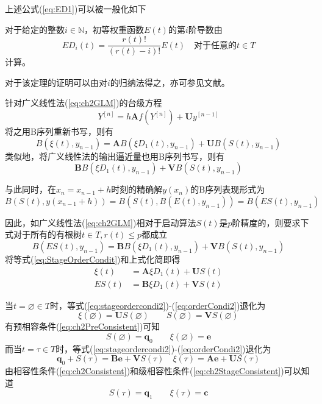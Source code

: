 上述公式(\ref{eq:ED1})可以被一般化如下
\begin{theorem}
对于给定的整数$i\in\mathbb{N}$，初等权重函数$E(t)$的第$i$阶导数由
\begin{equation}
ED_i(t)=\frac{r(t)!}{(r(t)-i)!}E(t)\quad \text{对于任意的}t\in T
\end{equation}计算。
\end{theorem}
对于该定理的证明可以由对$i$的归纳法得之，亦可参见文献。

针对广义线性法(\ref{eq:ch2GLM})的台级方程
\begin{equation}
Y^{[n]}=h\bm{A}f(Y^{[n]})+\bm{U}y^{[n-1]}
\end{equation}
将之用B序列重新书写，则有
\begin{equation}
B(\xi(t),y_{n-1})=\bm{A}B(\xi D_1(t),y_{n-1})+\bm{U}B(S(t),y_{n-1})\label{eq:StageOrderCondit}
\end{equation}
类似地，将广义线性法的输出逼近量也用B序列书写，则有
\begin{equation}
\bm{B}B(\xi D_1(t),y_{n-1})+\bm{V}B(S(t),y_{n-1})
\end{equation}

与此同时，在$x_n=x_{n-1}+h$时刻的精确解$y(x_n)$的B序列表现形式为
\begin{equation}
B(S(t),y(x_{n-1}+h))=B(S(t),B(E(t),y_{n-1}))=B(ES(t),y_{n-1})
\end{equation}

因此，如广义线性法(\ref{eq:ch2GLM})相对于启动算法$S(t)$是$p$阶精度的，则要求下式对于所有的有根树$t\in T,r(t)\le p$都成立
\begin{equation}
B(ES(t),y_{n-1})=\bm{B}B(\xi D_1(t),y_{n-1})+\bm{V}B(S(t),y_{n-1})
\end{equation}
将等式(\ref{eq:StageOrderCondit})和上式化简即得
\begin{align}
\xi(t)&=\bm{A}\xi D_1(t)+\bm{U}S(t)\label{eq:stageordercondi2}\\
ES(t)&=\bm{B}\xi D_1(t)+\bm{V}S(t)\label{eq:orderCondi2}
\end{align}

当$t=\varnothing\in T$时，等式(\ref{eq:stageordercondi2})-(\ref{eq:orderCondi2})退化为
\begin{equation}
\xi(\varnothing) = \bm{U}S(\varnothing) \qquad S(\varnothing)= \bm{V}S(\varnothing)
\end{equation}
有预相容条件(\ref{eq:ch2PreConsistent})可知
\begin{equation}
S(\varnothing) =\bm{q}_0\qquad \xi(\varnothing) =\bm{e}\label{eq:rtprecon}
\end{equation}
而当$t=\tau\in T$时，等式(\ref{eq:stageordercondi2})-(\ref{eq:orderCondi2})退化为
\begin{equation}
\bm{q}_0+S(\tau)=\bm{Be}+\bm{V}S(\tau)\quad \xi(\tau)=\bm{Ae}+\bm{U}S(\tau)
\end{equation}
由相容性条件(\ref{eq:ch2Consistent})和级相容性条件(\ref{eq:ch2StageConsistent})可以知道
\begin{equation}
S(\tau)=\bm{q}_1\qquad \xi(\tau)=\bm{c}\label{eq:rtconsist}
\end{equation}


